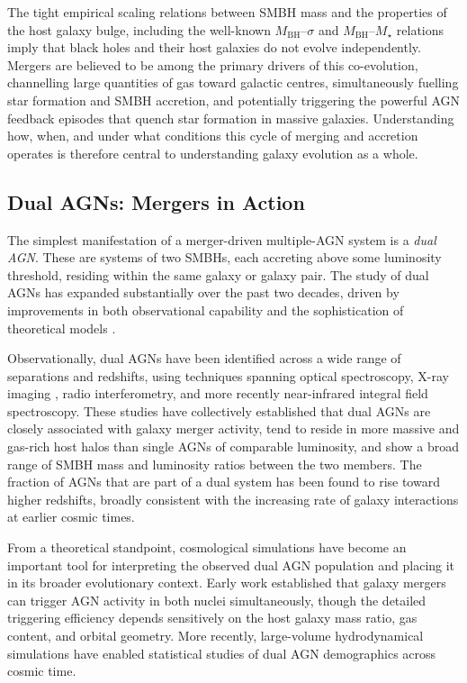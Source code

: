 \documentclass[twocolumn, 10pt]{article}
\begin{document}
The tight empirical scaling relations between SMBH mass and the properties of the host galaxy bulge, including the well-known $M_\mathrm{BH}$--$\sigma$ and $M_\mathrm{BH}$--$M_\star$ relations imply that black holes and their host galaxies do not evolve independently. Mergers are believed to be among the primary drivers of this co-evolution, channelling large quantities of gas toward galactic centres, simultaneously fuelling star formation and SMBH accretion, and potentially triggering the powerful AGN feedback episodes that quench star formation in massive galaxies. Understanding how, when, and under what conditions this cycle of merging and accretion operates is therefore central to understanding galaxy evolution as a whole.
 
\subsection{Dual AGNs: Mergers in Action}
\label{subsec:dual_agns}
 
The simplest manifestation of a merger-driven multiple-AGN system is a \textit{dual AGN}. These are systems of two SMBHs, each accreting above some luminosity threshold, residing within the same galaxy or galaxy pair. The study of dual AGNs has expanded substantially over the past two decades, driven by improvements in both observational capability and the sophistication of theoretical models \citep[see][]{DeRosa2019}.
 
Observationally, dual AGNs have been identified across a wide range of separations and redshifts, using techniques spanning optical spectroscopy, X-ray imaging \citep[e.g.][]{Foord2020}, radio interferometry, and more recently near-infrared integral field spectroscopy. These studies have collectively established that dual AGNs are closely associated with galaxy merger activity, tend to reside in more massive and gas-rich host halos than single AGNs of comparable luminosity, and show a broad range of SMBH mass and luminosity ratios between the two members. The fraction of AGNs that are part of a dual system has been found to rise toward higher redshifts, broadly consistent with the increasing rate of galaxy interactions at earlier cosmic times.
 
From a theoretical standpoint, cosmological simulations have become an important tool for interpreting the observed dual AGN population and placing it in its broader evolutionary context. Early work established that galaxy mergers can trigger AGN activity in both nuclei simultaneously, though the detailed triggering efficiency depends sensitively on the host galaxy mass ratio, gas content, and orbital geometry. More recently, large-volume hydrodynamical simulations have enabled statistical studies of dual AGN demographics across cosmic time.
 
\end{document}
